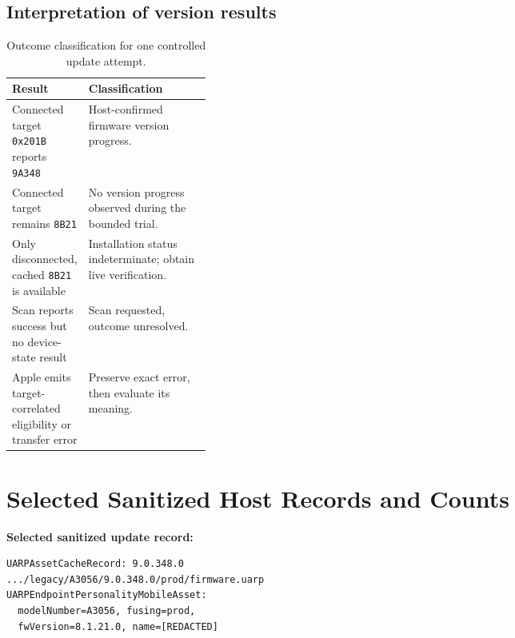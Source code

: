 \documentclass[11pt,letterpaper]{article}
\begin{document}
\subsection{Interpretation of version results}
\begin{table}[H]\centering\small
\caption{Outcome classification for one controlled update attempt.}
\begin{tabularx}{\linewidth}{@{}p{0.29\linewidth}X@{}}\toprule
Result & Classification \\ \midrule
Connected target \texttt{0x201B} reports \texttt{9A348} & Host-confirmed firmware version progress. \\
Connected target remains \texttt{8B21} & No version progress observed during the bounded trial. \\
Only disconnected, cached \texttt{8B21} is available & Installation status indeterminate; obtain live verification. \\
Scan reports success but no device-state result & Scan requested, outcome unresolved. \\
Apple emits target-correlated eligibility or transfer error & Preserve exact error, then evaluate its meaning. \\
\bottomrule\end{tabularx}
\end{table}

\section{Selected Sanitized Host Records and Counts}\label{app:records}

\noindent\textbf{Selected sanitized update record:}
\begin{lstlisting}
UARPAssetCacheRecord: 9.0.348.0
.../legacy/A3056/9.0.348.0/prod/firmware.uarp
UARPEndpointPersonalityMobileAsset:
  modelNumber=A3056, fusing=prod,
  fwVersion=8.1.21.0, name=[REDACTED]
\end{lstlisting}
\end{document}
